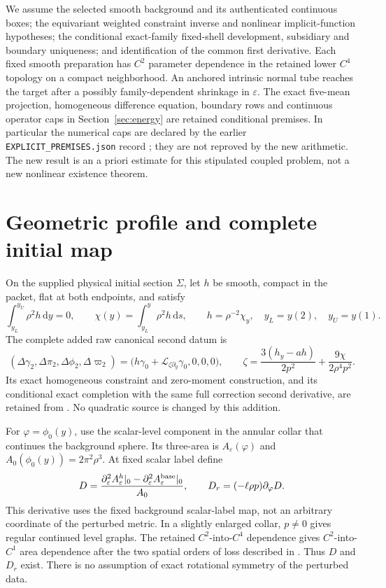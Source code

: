 \documentclass[11pt]{article}
\newcommand{\eps}{\varepsilon}
\newcommand{\dd}{\mathrm d}
\newcommand{\Lie}{\mathcal L}
\begin{document}
We assume the selected smooth background and its authenticated continuous
boxes; the equivariant weighted constraint inverse and nonlinear
implicit-function hypotheses; the conditional exact-family fixed-shell
development, subsidiary and boundary uniqueness; and identification of the
common first derivative. Each fixed smooth preparation has $C^2$ parameter
dependence in the retained lower $C^4$ topology on a compact neighborhood.
An anchored intrinsic normal tube reaches the target after a possibly
family-dependent shrinkage in $\eps$. The exact five-mean projection,
homogeneous difference equation, boundary rows and continuous operator
caps in Section~\ref{sec:energy} are retained conditional premises.
In particular the numerical caps are declared by the earlier
\texttt{EXPLICIT\_PREMISES.json} record \cite{records}; they are not
reproved by the new arithmetic. The new result is an a priori estimate
for this stipulated coupled problem, not a new nonlinear existence theorem.

\section{Geometric profile and complete initial map}

On the supplied physical initial section $\Sigma$, let $h$ be smooth,
compact in the packet, flat at both endpoints, and satisfy
\begin{equation}
 \int_{y_L}^{y_U}\rho^2h\,\dd y=0,\qquad
 \chi(y)=\int_{y_L}^y\rho^2h\,\dd s,\qquad
 h=\rho^{-2}\chi_y,\quad y_L=y(2),\quad y_U=y(1).
 \label{eq:admissible}
\end{equation}
The complete added raw canonical second datum is
\begin{equation}
 (\Delta\gamma_2,\Delta\pi_2,\Delta\phi_2,\Delta\varpi_2)
 =\bigl(h\gamma_0+\Lie_{\zeta\partial_y}\gamma_0,0,0,0\bigr),
 \qquad
 \zeta=\frac{3(h_y-ah)}{2p^2}+\frac{9\chi}{2\rho^4p^2}.
 \label{eq:raw}
\end{equation}
Its exact homogeneous constraint and zero-moment construction, and its
conditional exact completion with the same full correction second
derivative, are retained from \cite{preparation}. No quadratic source is
changed by this addition.

For $\varphi=\phi_0(y)$, use the scalar-level component in the annular
collar that continues the background sphere. Its three-area is
$A_\eps(\varphi)$ and $A_0(\phi_0(y))=2\pi^2\rho^3$. At fixed scalar
label define
\begin{equation}
 D=\frac{\partial_\eps^2A_\eps^h|_0-
                    \partial_\eps^2A_\eps^{\rm base}|_0}{A_0},
 \qquad
 D_r=(-\ell\rho p)\partial_\varphi D.
 \label{eq:geometry}
\end{equation}
This derivative uses the fixed background scalar-label map, not an arbitrary
coordinate of the perturbed metric. In a slightly enlarged collar, $p\ne0$
gives regular continued level graphs. The retained $C^2$-into-$C^4$
dependence gives $C^2$-into-$C^1$ area dependence after the two spatial
orders of loss described in \cite{intrinsic}. Thus $D$ and $D_r$ exist.
There is no assumption of exact rotational symmetry of the perturbed data.
\end{document}
